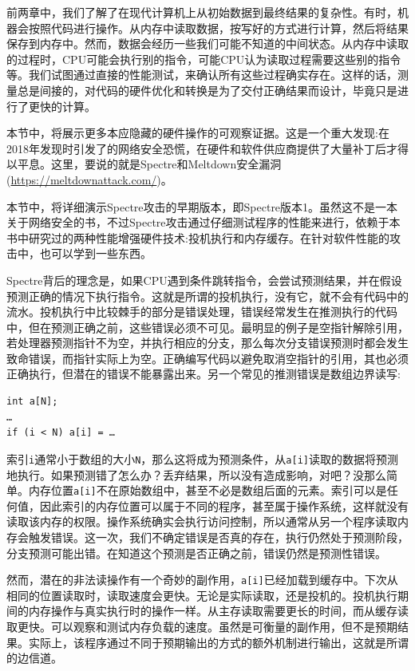 
前两章中，我们了解了在现代计算机上从初始数据到最终结果的复杂性。有时，机器会按照代码进行操作。从内存中读取数据，按写好的方式进行计算，然后将结果保存到内存中。然而，数据会经历一些我们可能不知道的中间状态。从内存中读取的过程时，CPU可能会执行别的指令，可能CPU认为读取过程需要这些别的指令等。我们试图通过直接的性能测试，来确认所有这些过程确实存在。这样的话，测量总是间接的，对代码的硬件优化和转换是为了交付正确结果而设计，毕竟只是进行了更快的计算。

本节中，将展示更多本应隐藏的硬件操作的可观察证据。这是一个重大发现:在2018年发现时引发了的网络安全恐慌，在硬件和软件供应商提供了大量补丁后才得以平息。这里，要说的就是Spectre和Meltdown安全漏洞(\url{https://meltdownattack.com/})。


本节中，将详细演示Spectre攻击的早期版本，即Spectre版本1。虽然这不是一本关于网络安全的书，不过Spectre攻击通过仔细测试程序的性能来进行，依赖于本书中研究过的两种性能增强硬件技术:投机执行和内存缓存。在针对软件性能的攻击中，也可以学到一些东西。

Spectre背后的理念是，如果CPU遇到条件跳转指令，会尝试预测结果，并在假设预测正确的情况下执行指令。这就是所谓的投机执行，没有它，就不会有代码中的流水。投机执行中比较棘手的部分是错误处理，错误经常发生在推测执行的代码中，但在预测正确之前，这些错误必须不可见。最明显的例子是空指针解除引用，若处理器预测指针不为空，并执行相应的分支，那么每次分支错误预测时都会发生致命错误，而指针实际上为空。正确编写代码以避免取消空指针的引用，其也必须正确执行，但潜在的错误不能暴露出来。另一个常见的推测错误是数组边界读写:

\begin{lstlisting}[style=styleCXX]
int a[N];
…
if (i < N) a[i] = …
\end{lstlisting}

索引\texttt{i}通常小于数组的大小\texttt{N}，那么这将成为预测条件，从\texttt{a[i]}读取的数据将预测地执行。如果预测错了怎么办？丢弃结果，所以没有造成影响，对吧？没那么简单。内存位置\texttt{a[i]}不在原始数组中，甚至不必是数组后面的元素。索引可以是任何值，因此索引的内存位置可以属于不同的程序，甚至属于操作系统，这样就没有读取该内存的权限。操作系统确实会执行访问控制，所以通常从另一个程序读取内存会触发错误。这一次，我们不确定错误是否真的存在，执行仍然处于预测阶段，分支预测可能出错。在知道这个预测是否正确之前，错误仍然是预测性错误。

然而，潜在的非法读操作有一个奇妙的副作用，\texttt{a[i]}已经加载到缓存中。下次从相同的位置读取时，读取速度会更快。无论是实际读取，还是投机的。投机执行期间的内存操作与真实执行时的操作一样。从主存读取需要更长的时间，而从缓存读取更快。可以观察和测试内存负载的速度。虽然是可衡量的副作用，但不是预期结果。实际上，该程序通过不同于预期输出的方式的额外机制进行输出，这就是所谓的边信道。

